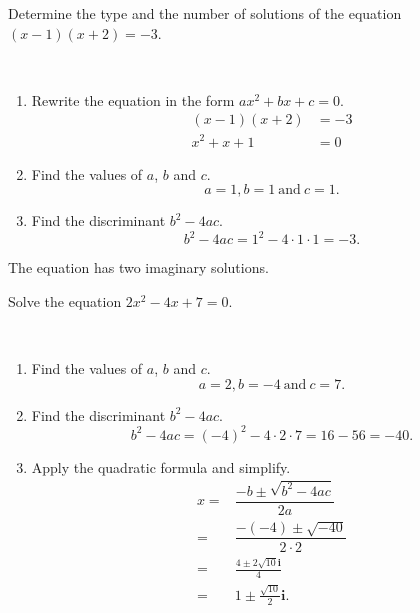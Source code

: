 \documentclass[en,11pt]{elegantbook}
\newcommand{\ii}{\mathbf{i}}
\let\BeginKnitrBlock\begin \let\EndKnitrBlock\end
\begin{document}
\BeginKnitrBlock{example}
\protect\hypertarget{exm:unnamed-chunk-129}{}{\label{exm:unnamed-chunk-129} }
Determine the type and the number of solutions of the equation \((x-1)(x+2)=-3\).
\EndKnitrBlock{example}

\BeginKnitrBlock{solution}
{}\\

\begin{enumerate}
\def\labelenumi{\arabic{enumi}.}

\item
  Rewrite the equation in the form \(ax^2+bx+c=0\).
  \[
       \begin{aligned}
           (x-1)(x+2)&=-3\\
           x^2+x+1&=0
       \end{aligned}
   \]
\item
  Find the values of \(a\), \(b\) and \(c\).
  \[
       a=1, b=1 ~\text{and}~ c=1.
   \]
\item
  Find the discriminant \(b^2-4ac\).
  \[
       b^2-4ac=1^2-4\cdot 1\cdot 1=-3.
   \]
\end{enumerate}

The equation has two imaginary solutions.
\EndKnitrBlock{solution}

\BeginKnitrBlock{example}
\protect\hypertarget{exm:unnamed-chunk-131}{}{\label{exm:unnamed-chunk-131} }
Solve the equation \(2x^2-4x+7=0\).
\EndKnitrBlock{example}

\BeginKnitrBlock{solution}
{}\\

\begin{enumerate}
\def\labelenumi{\arabic{enumi}.}

\item
  Find the values of \(a\), \(b\) and \(c\).
  \[
       a=2, b=-4 ~\text{and}~ c=7.
   \]
\item
  Find the discriminant \(b^2-4ac\).
  \[
       b^2-4ac=(-4)^2-4\cdot 2\cdot 7=16-56=-40.
   \]
\item
  Apply the quadratic formula and simplify.
  \[
   \begin{aligned}
       x=&\dfrac{-b\pm\sqrt{b^2-4ac}}{2a}\\
       =&\dfrac{-(-4)\pm\sqrt{-40}}{2\cdot 2}\\
       =&\frac{4\pm 2\sqrt{10} \ii}{4}\\
       =&1\pm\frac{\sqrt{10}}{2}\ii.
   \end{aligned}
   \]
\end{enumerate}
\EndKnitrBlock{solution}
\end{document}
